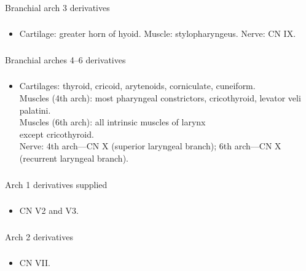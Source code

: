 \documentclass[11pt]{beamer}
\begin{document}
\begin{frame}
 \frametitle{}
Branchial arch 3 derivatives
\end{frame}

\begin{frame}
 \frametitle{}
\begin{itemize}
\item{Cartilage: greater horn of hyoid. Muscle: stylopharyngeus. Nerve: CN IX.}
\end{itemize}
\end{frame}

\begin{frame}
 \frametitle{}
Branchial arches 4–6 derivatives
\end{frame}

\begin{frame}
 \frametitle{}
\begin{itemize}
\item{Cartilages: thyroid, cricoid, arytenoids, corniculate, cuneiform. \\ Muscles (4th arch): most pharyngeal constrictors, cricothyroid, levator veli palatini. \\ Muscles (6th arch): all intrinsic muscles of larynx \\ except cricothyroid. \\ Nerve: 4th arch––CN X (superior laryngeal branch); 6th arch––CN X (recurrent laryngeal branch).}
\end{itemize}
\end{frame}

\begin{frame}
 \frametitle{}
Arch 1 derivatives supplied
\end{frame}

\begin{frame}
 \frametitle{}
\begin{itemize}
\item{ CN V2 and V3.}
\end{itemize}
\end{frame}

\begin{frame}
 \frametitle{}
Arch 2 derivatives
\end{frame}

\begin{frame}
 \frametitle{}
\begin{itemize}
\item{CN VII.}
\end{itemize}
\end{frame}
\end{document}
